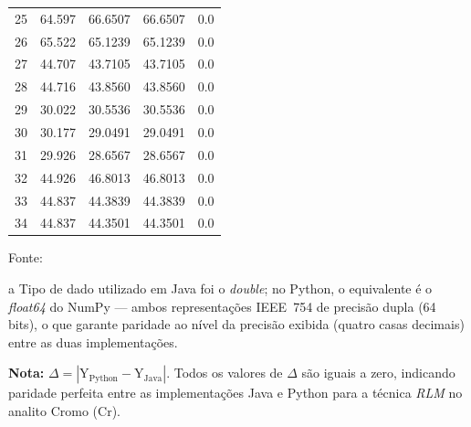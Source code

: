 \begin{table}[H]
\begin{threeparttable}
{\begin{tabular}{
    S[table-format=2.0]
    S[table-format=2.3]
    S[table-format=2.4]
    S[table-format=2.4]
    S[table-format=1.1]
}
25  & 64.597  & 66.6507  & 66.6507  & 0.0 \\
26  & 65.522  & 65.1239  & 65.1239  & 0.0 \\
27  & 44.707  & 43.7105  & 43.7105  & 0.0 \\
28  & 44.716  & 43.8560  & 43.8560  & 0.0 \\
29  & 30.022  & 30.5536  & 30.5536  & 0.0 \\
30  & 30.177  & 29.0491  & 29.0491  & 0.0 \\
31  & 29.926  & 28.6567  & 28.6567  & 0.0 \\
32  & 44.926  & 46.8013  & 46.8013  & 0.0 \\
33  & 44.837  & 44.3839  & 44.3839  & 0.0 \\
34  & 44.837  & 44.3501  & 44.3501  & 0.0 \\
\bottomrule
\end{tabular}%
}
\begin{center}
\begin{minipage}{0.85\linewidth}
\begin{tablenotes}
\footnotesize
\item Fonte:~\oautor
\item[a] Tipo de dado utilizado em Java foi o \textit{double}; no Python,
o equivalente é o \textit{float64} do NumPy — ambos representações IEEE~754
de precisão dupla (64 bits), o que garante paridade ao nível da precisão exibida (quatro casas decimais) entre as
duas implementações.
\item \textbf{Nota:} $\Delta = |\text{Y}_{\text{Python}} - \text{Y}_{\text{Java}}|$.
Todos os valores de $\Delta$ são iguais a zero, indicando paridade
perfeita entre as implementações Java e Python para a técnica \textit{RLM}
no analito Cromo (Cr).
\end{tablenotes}
\end{minipage}
\end{center}
\end{threeparttable}
\end{table}


